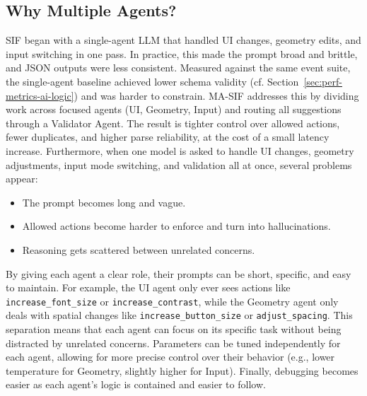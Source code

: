 \subsection{Why Multiple Agents?}
SIF began with a single-agent LLM that handled UI changes, geometry edits, and input switching in one pass. In practice, this made the prompt broad and brittle, and JSON outputs were less consistent. Measured against the same event suite, the single-agent baseline achieved lower schema validity (cf. Section~\ref{sec:perf-metrics-ai-logic}) and was harder to constrain. MA-SIF addresses this by dividing work across focused agents (UI, Geometry, Input) and routing all suggestions through a Validator Agent. The result is tighter control over allowed actions, fewer duplicates, and higher parse reliability, at the cost of a small latency increase.
Furthermore, when one model is asked to handle UI changes, geometry adjustments, input mode switching, and validation all at once, several problems appear:
\begin{itemize}
    \item The prompt becomes long and vague.
    \item Allowed actions become harder to enforce and turn into hallucinations.
    \item Reasoning gets scattered between unrelated concerns.
\end{itemize}
By giving each agent a clear role, their prompts can be short, specific, and easy to maintain.
For example, the UI agent only ever sees actions like \texttt{increase\_font\_size} or \texttt{increase\_contrast}, while the Geometry agent only deals with spatial changes like \texttt{increase\_button\_size} or \texttt{adjust\_spacing}.
This separation means that each agent can focus on its specific task without being distracted by unrelated concerns. Parameters can be tuned independently for each agent, allowing for more precise control over their behavior (e.g., lower temperature for Geometry, slightly higher for Input). Finally, debugging becomes easier as each agent's logic is contained and easier to follow.

